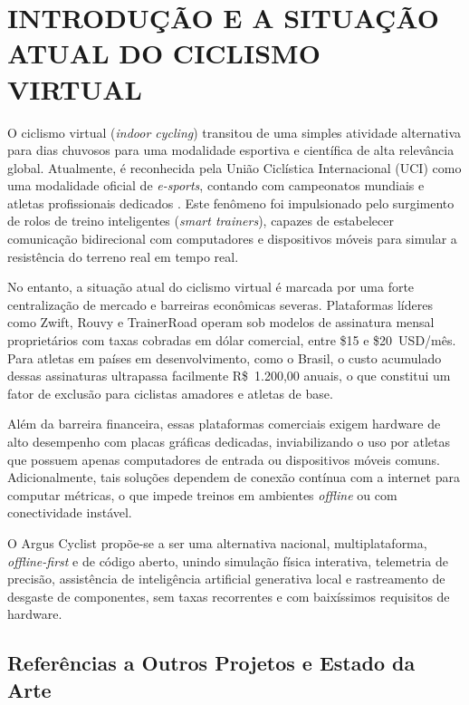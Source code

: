 \documentclass[
    a4paper,
    12pt,
    oneside,
    english,
    brazil,
    chapter=TITLE,
    section=TITLE,
]{abntex2}
\begin{document}
\textual
\chapter{INTRODUÇÃO E A SITUAÇÃO ATUAL DO CICLISMO VIRTUAL}
\label{sec:introducao}

O ciclismo virtual (\textit{indoor cycling}) transitou de uma simples atividade alternativa para dias chuvosos para uma modalidade esportiva e científica de alta relevância global. Atualmente, é reconhecida pela União Ciclística Internacional (UCI) como uma modalidade oficial de \textit{e-sports}, contando com campeonatos mundiais e atletas profissionais dedicados \cite{coggan2010}. Este fenômeno foi impulsionado pelo surgimento de rolos de treino inteligentes (\textit{smart trainers}), capazes de estabelecer comunicação bidirecional com computadores e dispositivos móveis para simular a resistência do terreno real em tempo real.

No entanto, a situação atual do ciclismo virtual é marcada por uma forte centralização de mercado e barreiras econômicas severas. Plataformas líderes como Zwift, Rouvy e TrainerRoad operam sob modelos de assinatura mensal proprietários com taxas cobradas em dólar comercial, entre \$15 e \$20~USD/mês. Para atletas em países em desenvolvimento, como o Brasil, o custo acumulado dessas assinaturas ultrapassa facilmente R\$~1.200,00 anuais, o que constitui um fator de exclusão para ciclistas amadores e atletas de base.

Além da barreira financeira, essas plataformas comerciais exigem hardware de alto desempenho com placas gráficas dedicadas, inviabilizando o uso por atletas que possuem apenas computadores de entrada ou dispositivos móveis comuns. Adicionalmente, tais soluções dependem de conexão contínua com a internet para computar métricas, o que impede treinos em ambientes \textit{offline} ou com conectividade instável.

O Argus Cyclist propõe-se a ser uma alternativa nacional, multiplataforma, \textit{offline-first} e de código aberto, unindo simulação física interativa, telemetria de precisão, assistência de inteligência artificial generativa local e rastreamento de desgaste de componentes, sem taxas recorrentes e com baixíssimos requisitos de hardware.

\section{Referências a Outros Projetos e Estado da Arte}
\label{sec:estado-arte}
\end{document}
